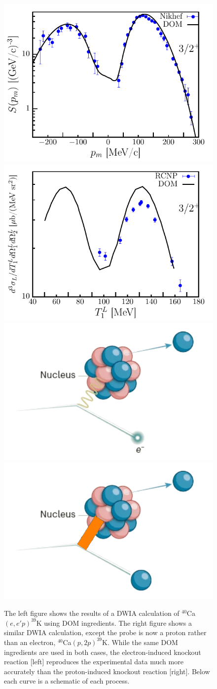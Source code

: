\documentclass[12pt]{article}
\begin{document}
\begin{figure}
   \label{fig:eep_p2p}
   \begin{center}
      \includegraphics[width=0.49\linewidth]{figures/eep100.pdf}
      \includegraphics[width=0.49\linewidth]{figures/p2p.pdf}
      \includegraphics[width=0.49\linewidth]{figures/eep-schematic-alpha.png}
      \includegraphics[width=0.49\linewidth]{figures/p2p-schematic-alpha_oldV.png}
   \end{center}
   \caption{The left figure shows the results of a DWIA calculation of $^{40}$Ca$(e,e'p)^{39}$K using DOM ingredients. The right figure shows a similar DWIA calculation, except the
   probe is now a proton rather than an electron, $^{40}$Ca$(p,2p)^{39}$K. While the same DOM ingredients are used in both cases, the electron-induced knockout reaction [left] reproduces
the experimental data much more accurately than the proton-induced knockout reaction [right]. Below each curve is a schematic of each process.}
\end{figure}
\end{document}
